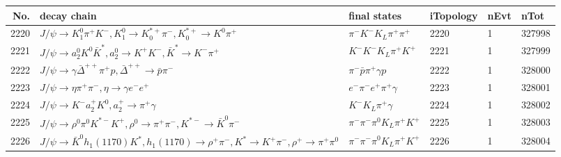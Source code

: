 \begin{table}[htbp] 
\begin{center}
\begin{small}
\begin{tabular}{rlllll}\hline\hline
 No. & decay chain & final states &  iTopology & nEvt & nTot \\\hline
2220&$J/\psi       \rightarrow K_1^{0}        \pi^{+}        K^{-}          , K_1^{0}         \rightarrow K_{0}^{*+}     \pi^{-}        , K_{0}^{*+}      \rightarrow K^{0}          \pi^{+}        $&$\pi^{-}        K^{-}          K_{L}          \pi^{+}        \pi^{+}        $& 2220&    1&327998\\
2221&$J/\psi       \rightarrow a_{2}^{0}      K^{0}          \bar{K}^{*}   , a_{2}^{0}       \rightarrow K^{+}          K^{-}          , \bar{K}^{*}    \rightarrow K^{-}          \pi^{+}        $&$K^{-}          K^{-}          K_{L}          \pi^{+}        K^{+}          $& 2221&    1&327999\\
2222&$J/\psi       \rightarrow \gamma       \bar{\Delta}^{++}\pi^{+}        p                 , \bar{\Delta}^{++} \rightarrow \bar{p}          \pi^{-}        $&$\pi^{-}        \bar{p}          \pi^{+}        \gamma       p                 $& 2222&    1&328000\\
2223&$J/\psi       \rightarrow \eta          \pi^{+}        \pi^{-}        , \eta           \rightarrow \gamma       e^{-}        e^{+}        $&$e^{-}        \pi^{-}        e^{+}        \pi^{+}        \gamma       $& 2223&    1&328001\\
2224&$J/\psi       \rightarrow K^{-}          a_{2}^{+}      K^{0}          , a_{2}^{+}       \rightarrow \pi^{+}        \gamma       $&$K^{-}          K_{L}          \pi^{+}        \gamma       $& 2224&    1&328002\\
2225&$J/\psi       \rightarrow \rho^{0}      \pi^{0}        K^{*-}         K^{+}          , \rho^{0}       \rightarrow \pi^{+}        \pi^{-}        , K^{*-}          \rightarrow \bar{K}^{0}   \pi^{-}        $&$\pi^{-}        \pi^{-}        \pi^{0}        K_{L}          \pi^{+}        K^{+}          $& 2225&    1&328003\\
2226&$J/\psi       \rightarrow \bar{K}^{0}   h_{1}(1170)    K^{*}          , h_{1}(1170)     \rightarrow \rho^{+}      \pi^{-}        , K^{*}           \rightarrow K^{+}          \pi^{-}        , \rho^{+}       \rightarrow \pi^{+}        \pi^{0}        $&$\pi^{-}        \pi^{-}        \pi^{0}        K_{L}          \pi^{+}        K^{+}          $& 2226&    1&328004\\

\end{tabular}
\end{small}
\end{center}
\end{table}
